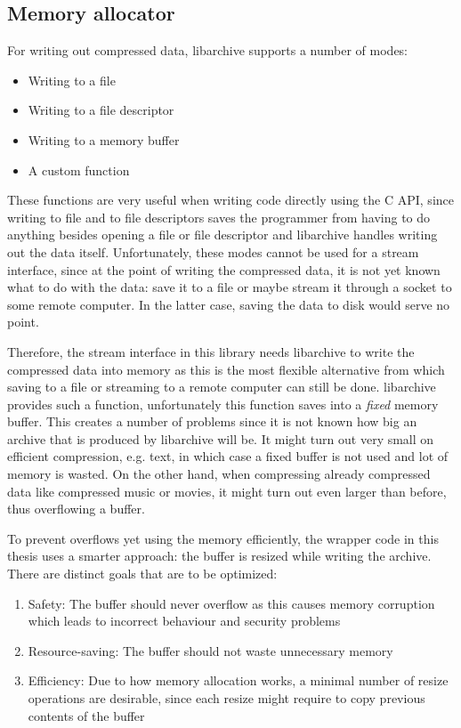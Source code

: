 \documentclass[parskip=half]{scrreprt}
\begin{document}
\subsection{Memory allocator}
\label{sec:allocator}

For writing out compressed data, libarchive supports a number of modes:

\begin{itemize}
  \item Writing to a file
  \item Writing to a file descriptor
  \item Writing to a memory buffer
  \item A custom function
\end{itemize}

These functions are very useful when writing code directly using the C API,
since writing to file and to file descriptors saves the programmer from having
to do anything besides opening a file or file descriptor and libarchive handles
writing out the data itself. Unfortunately, these modes cannot be used for a
stream interface, since at the point of writing the compressed data, it is not
yet known what to do with the data: save it to a file or maybe stream it
through a socket to some remote computer. In the latter case, saving the data
to disk would serve no point.

Therefore, the stream interface in this library needs libarchive to write the
compressed data into memory as this is the most flexible alternative from which
saving to a file or streaming to a remote computer can still be done.
libarchive provides such a function, unfortunately this function saves into a
\emph{fixed} memory buffer. This creates a number of problems since it is not
known how big an archive that is produced by libarchive will be. It might turn
out very small on efficient compression, e.g. text, in which case a fixed
buffer is not used and lot of memory is wasted. On the other hand, when
compressing already compressed data like compressed music or movies, it might
turn out even larger than before, thus overflowing a buffer.

To prevent overflows yet using the memory efficiently, the wrapper code in this
thesis uses a smarter approach: the buffer is resized while writing the
archive. There are distinct goals that are to be optimized:

\begin{enumerate}
  \item Safety: The buffer should never overflow as this causes memory
    corruption which leads to incorrect behaviour and security problems
  \item Resource-saving: The buffer should not waste unnecessary memory
  \item Efficiency: Due to how memory allocation works, a minimal number
    of resize operations are desirable, since each resize might require
    to copy previous contents of the buffer
\end{enumerate}
\end{document}
